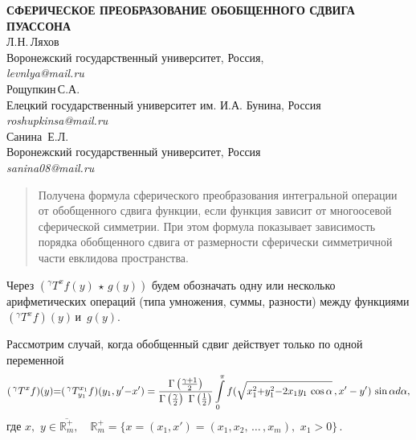 \begin{center}
{ \bf СФЕРИЧЕСКОЕ ПРЕОБРАЗОВАНИЕ ОБОБЩЕННОГО СДВИГА  ПУАССОНА }\\
Л.Н.\,Ляхов \\
Воронежский государственный университет, Россия, \\
{\it levnlya@mail.ru} \\
Рощупкин\,С.А. \\
Елецкий государственный университет им. И.А. Бунина, Россия \\
 {\it roshupkinsa@mail.ru}\\
 Санина \,Е.Л. \\
Воронежский государственный университет, Россия \\
{\it sanina08@mail.ru}
\end{center}


\begin{quote}
 {\small
Получена формула сферического преобразования интегральной операции от обобщенного сдвига функции, если функция зависит от многоосевой сферической симметрии. При этом формула показывает зависимость порядка обобщенного сдвига от размерности сферически симметричной части евклидова пространства.}
 \end{quote}

	Через
	$
	\left(^\gamma T^xf(y)\,\star\,g(y)\right)
	$
	будем обозначать одну или несколько арифметических операций (типа умножения, суммы, разности) между функциями $\left(^\gamma T^xf\right)(y)$\,и \,$g(y)$.

	 Рассмотрим случай, когда обобщенный сдвиг действует только по одной переменной
$$(\,^\gamma T^{x}f)(y){=}(\,^\gamma T_{y_1}^{x_1}f)(y_1,y'{-}x')=
\frac{\Gamma\left(\gamma+1\over2\right)}{\Gamma\left(\frac{\gamma}{2}\right)\,\,\Gamma\left(\frac{1}{2}\right)}\int\limits_0^\pi
f(\sqrt{x_1^2{+}y^2_1{-}2x_1y_1\,\cos\alpha}\,,x'-y')\,\sin\alpha
d\alpha,$$
где $x,\,\,y\in\overline{\mathbb{R}^+_m},\quad	\mathbb{R}^+_m{=}\{x{=}(x_1,x'){=}(x_1,x_2,\,\ldots\,,x_m),\,\,x_1>0\}\,.$

